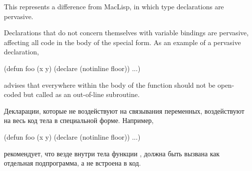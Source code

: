 \begin{defspec}
\beforenoterule
\begin{incompatibility}
This represents a difference from MacLisp, in which type
declarations are pervasive.
\end{incompatibility}
\afternoterule

Declarations that do not concern themselves with variable bindings are
pervasive, affecting all code in the body of the special form.
As an example of a pervasive declaration,
\begin{lisp}
(defun foo (x y) (declare (notinline floor)) ...)
\end{lisp}
advises that everywhere within the body of  the function
 should not be open-coded but called as an out-of-line subroutine.

Декларации, которые не воздействуют на связывания переменных, воздействуют на
весь код тела в специальной форме.
Например,
\begin{lisp}
(defun foo (x y) (declare (notinline floor)) ...)
\end{lisp}
рекомендует, что везде внутри тела функции ,  должна быть
вызвана как отдельная подпрограмма, а не встроена в код.


\end{defspec}
